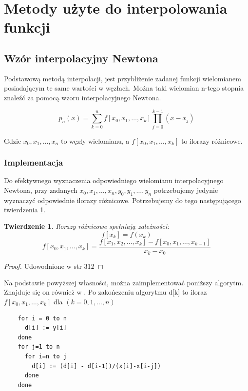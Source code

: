 \documentclass{article}
\newtheorem{twr}{Twierdzenie}
\begin{document}
\section{Metody użyte do interpolowania funkcji}


\subsection{Wzór interpolacyjny Newtona}

Podstawową metodą interpolacji, jest przybliżenie zadanej funkcji wielomianem posiadającym te same wartości w węzłach. Można taki wielomian n-tego stopnia znaleźć za pomocą wzoru interpolacyjnego Newtona.\cite{kincaid}

\begin{equation}\label{Newton}
p_{n}(x) = \sum_{k=0}^{n}f[x_{0},x_{1},\dots,x_{k}]\prod\limits_{j=0}^{k-1}(x-x_{j})
\end{equation}

Gdzie $x_0,x_1,\dots,x_n$ to węzły wielomianu, a $f[x_{0},x_{1},\dots,x_{k}]$ to ilorazy różnicowe. 

	\subsubsection{Implementacja}
	
	Do efektywnego wyznaczenia odpowiedniego wielomianu interpolacyjnego Newtona, przy zadanych $x_0,x_1,\dots,x_n,y_0,y_1,\dots,y_n$ potrzebujemy jedynie wyznaczyć odpowiednie ilorazy różnicowe. Potrzebujemy do tego następującego twierdzenia \ref{ilorazy roznicowe}.
	
		\begin{twr}
			\label{ilorazy roznicowe}
			Ilorazy różnicowe spełniają zależności:
			$$f[x_k] = f(x_k)$$
			\begin{equation}
			f[x_{0},x_{1},\dots,x_{k}] = \frac{f[x_{1},x_{2},\dots,x_{k}] - f[x_{0},x_{1},\dots,x_{k-1}]}{x_k-x_0}
			\end{equation}
		\end{twr}
		\begin{proof}
			Udowodnione w \cite{kincaid} str 312
		\end{proof}
		
	Na podstawie powyższej własności, można zaimplementować poniższy algorytm. Znajduje się on również w \cite{kincaid}. Po zakończeniu algorytmu d[k] to iloraz $f[x_0,x_1,\dots,x_k]$ dla $(k=0,1,\dots,n)$
	
	\begin{verbatim}
	for i = 0 to n
	  d[i] := y[i]
	done
	for j=1 to n
	  for i=n to j
	    d[i] := (d[i] - d[i-1])/(x[i]-x[i-j])	
	  done
	done	
	\end{verbatim}
	
\end{document}
